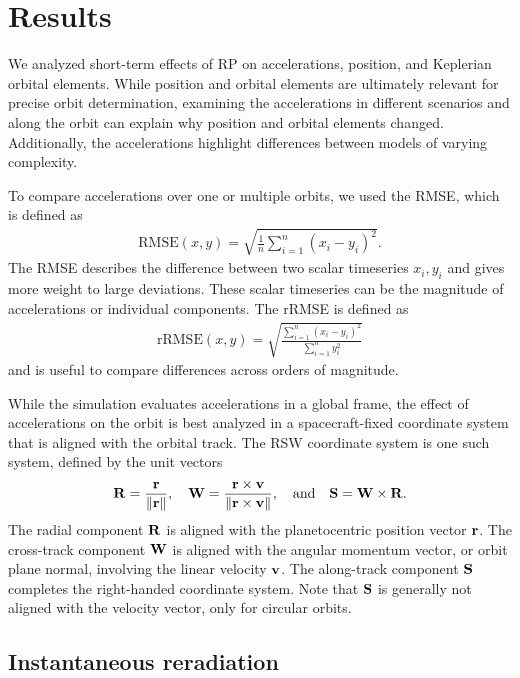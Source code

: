 \section{Results}
We analyzed short-term effects of \gls{RP} on accelerations, position, and Keplerian orbital elements. While position and orbital elements are ultimately relevant for precise orbit determination, examining the accelerations in different scenarios and along the orbit can explain why position and orbital elements changed. Additionally, the accelerations highlight differences between models of varying complexity.

To compare accelerations over one or multiple orbits, we used the \gls{RMSE}, which is defined as
\begin{align}
    \text{RMSE}(x, y) = \sqrt{\frac{1}{n}\sum_{i=1}^{n}\left(x_i - y_i\right)^2}.
\end{align}
The \gls{RMSE} describes the difference between two scalar timeseries $x_i, y_i$ and gives more weight to large deviations. These scalar timeseries can be the magnitude of accelerations or individual components. The \gls{rRMSE} is defined as
\begin{align}
    \text{rRMSE}(x, y) = \sqrt{\frac{\sum_{i=1}^{n}\left(x_i - y_i\right)^2}{\sum_{i=1}^{n} y_i^2}}
\end{align}
and is useful to compare differences across orders of magnitude.

While the simulation evaluates accelerations in a global frame, the effect of accelerations on the orbit is best analyzed in a spacecraft-fixed coordinate system that is aligned with the orbital track. The RSW coordinate system is one such system, defined by the unit vectors~\cite{Vallado2013}
\begin{align}
    \vb R = \frac{\vb r}{\norm{\vb r}}, \quad
    \vb W = \frac{\vb r \times \vb v}{\norm{\vb r \times \vb v}},
    \quad \textrm{and} \quad \vb S = \vb W \times \vb R.
\end{align}
The radial component $\vb R$ is aligned with the planetocentric position vector $\vb r$. The cross-track component $\vb W$ is aligned with the angular momentum vector, or orbit plane normal, involving the linear velocity $\vb v$. The along-track component $\vb S$ completes the right-handed coordinate system. Note that $\vb S$ is generally not aligned with the velocity vector, only for circular orbits.





\subsection{Instantaneous reradiation}
\label{subsec:inst-rerad}

